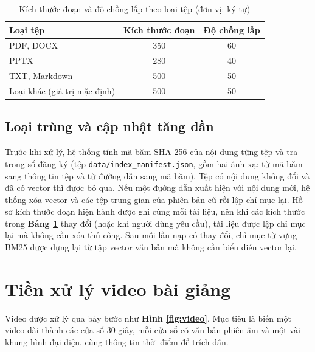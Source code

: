 \begin{table}[ht]
    \centering
    \caption{Kích thước đoạn và độ chồng lấp theo loại tệp (đơn vị: ký tự)}
    \label{tab:chunk}
    \begin{tabular}{|l|c|c|}
    \hline
    \textbf{Loại tệp} & \textbf{Kích thước đoạn} & \textbf{Độ chồng lấp} \\
    \hline
    PDF, DOCX & 350 & 60 \\
    \hline
    PPTX & 280 & 40 \\
    \hline
    TXT, Markdown & 500 & 50 \\
    \hline
    Loại khác (giá trị mặc định) & 500 & 50 \\
    \hline
    \end{tabular}
\end{table}

\subsection{Loại trùng và cập nhật tăng dần}

Trước khi xử lý, hệ thống tính mã băm SHA-256 của nội dung từng tệp và tra trong sổ đăng ký (tệp \texttt{data/index\_manifest.json}, gồm hai ánh xạ: từ mã băm sang thông tin tệp và từ đường dẫn sang mã băm). Tệp có nội dung không đổi và đã có vector thì được bỏ qua. Nếu một đường dẫn xuất hiện với nội dung mới, hệ thống xóa vector và các tệp trung gian của phiên bản cũ rồi lập chỉ mục lại. Hồ sơ kích thước đoạn hiện hành được ghi cùng mỗi tài liệu, nên khi các kích thước trong \textbf{Bảng \ref{tab:chunk}} thay đổi (hoặc khi người dùng yêu cầu), tài liệu được lập chỉ mục lại mà không cần xóa thủ công. Sau mỗi lần nạp có thay đổi, chỉ mục từ vựng BM25 được dựng lại từ tập vector văn bản mà không cần biểu diễn vector lại.


\section{Tiền xử lý video bài giảng}\label{sec:tien-xu-ly-video}

Video được xử lý qua bảy bước như \textbf{Hình \ref{fig:video}}. Mục tiêu là biến một video dài thành các cửa sổ 30 giây, mỗi cửa sổ có văn bản phiên âm và một vài khung hình đại diện, cùng thông tin thời điểm để trích dẫn.

